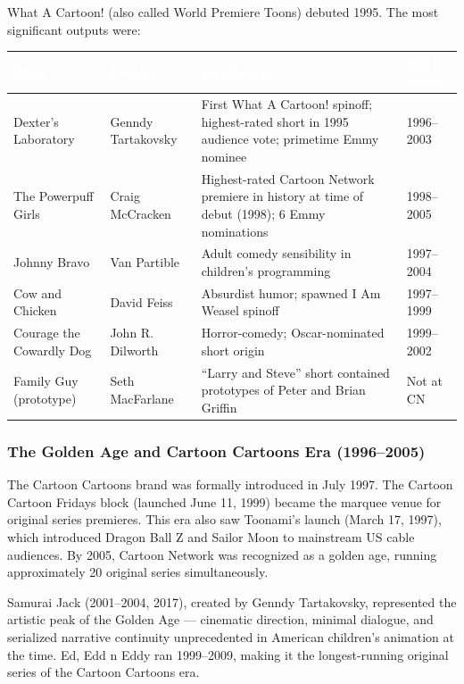 \documentclass[11pt,letterpaper]{article}
\newcommand{\tableheader}[1]{\textbf{\sffamily\textcolor{white}{#1}}}
\begin{document}
What A Cartoon! (also called World Premiere Toons) debuted 1995. The most significant outputs were:

\begin{center}
\begin{tabularx}{\textwidth}{L{3.5cm}L{3.5cm}XL{2.5cm}}
\toprule
{}
\tableheader{Show} & \tableheader{Creator} & \tableheader{Significance} & \tableheader{Full Series} \\
\midrule
Dexter's Laboratory & Genndy Tartakovsky & First What A Cartoon! spinoff; highest-rated short in 1995 audience vote; primetime Emmy nominee & 1996--2003 \\
The Powerpuff Girls & Craig McCracken & Highest-rated Cartoon Network premiere in history at time of debut (1998); 6 Emmy nominations & 1998--2005 \\
Johnny Bravo & Van Partible & Adult comedy sensibility in children's programming & 1997--2004 \\
Cow and Chicken & David Feiss & Absurdist humor; spawned I Am Weasel spinoff & 1997--1999 \\
Courage the Cowardly Dog & John R. Dilworth & Horror-comedy; Oscar-nominated short origin & 1999--2002 \\
Family Guy (prototype) & Seth MacFarlane & ``Larry and Steve'' short contained prototypes of Peter and Brian Griffin & Not at CN \\
\bottomrule
\end{tabularx}
\end{center}

\subsubsection{The Golden Age and Cartoon Cartoons Era (1996--2005)}

The Cartoon Cartoons brand was formally introduced in July 1997. The Cartoon Cartoon Fridays block (launched June 11, 1999) became the marquee venue for original series premieres. This era also saw Toonami's launch (March 17, 1997), which introduced Dragon Ball Z and Sailor Moon to mainstream US cable audiences. By 2005, Cartoon Network was recognized as a golden age, running approximately 20 original series simultaneously.

Samurai Jack (2001--2004, 2017), created by Genndy Tartakovsky, represented the artistic peak of the Golden Age --- cinematic direction, minimal dialogue, and serialized narrative continuity unprecedented in American children's animation at the time. Ed, Edd n Eddy ran 1999--2009, making it the longest-running original series of the Cartoon Cartoons era.
\end{document}
